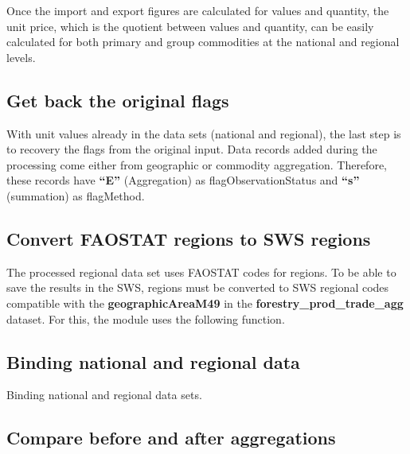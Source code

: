 \documentclass[
]{book}
\begin{document}
Once the import and export figures are calculated for values and quantity, the unit price, which is the quotient between values and quantity, can be easily calculated for both primary and group commodities at the national and regional levels.

\hypertarget{get-back-the-original-flags}{%
\subsection{\texorpdfstring{\textbf{Get back the original flags}}{Get back the original flags}}\label{get-back-the-original-flags}}

With unit values already in the data sets (national and regional), the last step is to recovery the flags from the original input. Data records added during the processing come either from geographic or commodity aggregation. Therefore, these records have \textbf{``E''} (Aggregation) as flagObservationStatus and \textbf{``s''} (summation) as flagMethod.

\hypertarget{convert-faostat-regions-to-sws-regions}{%
\subsection{\texorpdfstring{\textbf{Convert FAOSTAT regions to SWS regions}}{Convert FAOSTAT regions to SWS regions}}\label{convert-faostat-regions-to-sws-regions}}

The processed regional data set uses FAOSTAT codes for regions. To be able to save the results in the SWS, regions must be converted to SWS regional codes compatible with the \textbf{geographicAreaM49} in the \textbf{forestry\_prod\_trade\_agg} dataset. For this, the module uses the following function.

\hypertarget{binding-national-and-regional-data}{%
\subsection{\texorpdfstring{\textbf{Binding national and regional data}}{Binding national and regional data}}\label{binding-national-and-regional-data}}

Binding national and regional data sets.

\hypertarget{compare-before-and-after-aggregations}{%
\subsection{\texorpdfstring{\textbf{Compare before and after aggregations}}{Compare before and after aggregations}}\label{compare-before-and-after-aggregations}}
\end{document}
